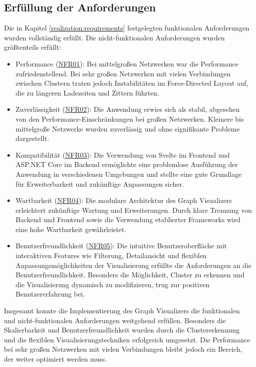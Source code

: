 \subsection{Erfüllung der Anforderungen}

Die in Kapitel \ref{realization:requirements} festgelegten funktionalen Anforderungen wurden vollständig erfüllt. Die nicht-funktionalen Anforderungen wurden größtenteils erfüllt:

\begin{itemize}
    \item Performance (\hyperref[NFR01]{NFR01}): Bei mittelgroßen Netzwerken war die Performance zufriedenstellend. Bei sehr großen Netzwerken mit vielen Verbindungen zwischen Clustern traten jedoch Instabilitäten im Force-Directed Layout auf, die zu längeren Ladezeiten und Zittern führten.
    \item Zuverlässigkeit (\hyperref[NFR02]{NFR02}): Die Anwendung erwies sich als stabil, abgesehen von den Performance-Einschränkungen bei großen Netzwerken. Kleinere bis mittelgroße Netzwerke wurden zuverlässig und ohne signifikante Probleme dargestellt.
    \item Kompatibilität (\hyperref[NFR03]{NFR03}): Die Verwendung von Svelte im Frontend und ASP.NET Core im Backend ermöglichte eine problemlose Ausführung der Anwendung in verschiedenen Umgebungen und stellte eine gute Grundlage für Erweiterbarkeit und zukünftige Anpassungen sicher.
    \item Wartbarkeit (\hyperref[NFR04]{NFR04}): Die modulare Architektur des Graph Visualizers erleichtert zukünftige Wartung und Erweiterungen. Durch klare Trennung von Backend und Frontend sowie die Verwendung etablierter Frameworks wird eine hohe Wartbarkeit gewährleistet.
    \item Benutzerfreundlichkeit (\hyperref[NFR05]{NFR05}): Die intuitive Benutzeroberfläche mit interaktiven Features wie Filterung, Detailansicht und flexiblen Anpassungsmöglichkeiten der Visualisierung erfüllte die Anforderungen an die Benutzerfreundlichkeit. Besonders die Möglichkeit, Cluster zu erkennen und die Visualisierung dynamisch zu modifizieren, trug zur positiven Benutzererfahrung bei.
\end{itemize}

Insgesamt konnte die Implementierung des Graph Visualizers die funktionalen und nicht-funktionalen Anforderungen weitgehend erfüllen. Besonders die Skalierbarkeit und Benutzerfreundlichkeit wurden durch die Clustererkennung und die flexiblen Visualisierungstechniken erfolgreich umgesetzt. Die Performance bei sehr großen Netzwerken mit vielen Verbindungen bleibt jedoch ein Bereich, der weiter optimiert werden muss.

